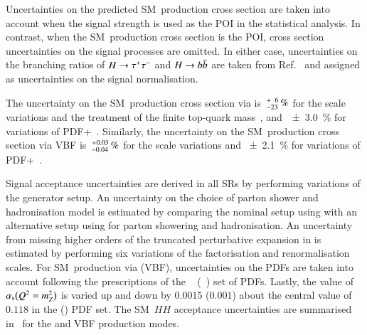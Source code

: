 Uncertainties on the predicted SM~\HH production cross section are taken into
account when the signal strength is used as the POI in the statistical
analysis. In contrast, when the SM~\HH production cross section is the POI,
cross section uncertainties on the signal processes are omitted. In either case,
uncertainties on the branching ratios of $H \to \tau^{+} \tau^{-}$ and $H \to b\bar{b}$ are
taken from Ref.~\cite{deFlorian:2016spz} and assigned as uncertainties on the
signal normalisation.

The uncertainty on the SM~\HH production cross section via \ggF
is~$^{\hspace{0.25pt}+\hspace{0.25pt}\phantom{2}6}_{-23}\,\si{\percent}$
for the scale variations and the treatment of the finite top-quark
mass~\cite{Baglio:2020wgt}, and~\SI{\pm 3.0}{\percent} for variations of
PDF+\alphas~\cite{LHCHWGHH}. Similarly, the uncertainty on the SM~\HH production
cross section via VBF
is~$^{\hspace{0.25pt}+\hspace{0.25pt}0.03}_{-0.04}\,\si{\percent}$ for
the scale variations and \SI{\pm 2.1}{\percent} for variations of
PDF+\alphas~\cite{LHCHWGHH}.

Signal acceptance uncertainties are derived in all SRs by performing variations
of the generator setup. An uncertainty on the choice of parton shower and
hadronisation model is estimated by comparing the nominal setup using \PYTHIA[8]
with an alternative setup using \HERWIG[7] for parton showering and
hadronisation. An uncertainty from missing higher orders of the truncated
perturbative expansion in \alphas is estimated by performing six variations of
the factorisation and renormalisation scales. For SM~\HH production via \ggF
(VBF), uncertainties on the PDFs are taken into account following the
prescriptions of the \PDFforLHC[15nlo]~\cite{Butterworth:2015oua}
(\NNPDF[3.0nlo]~\cite{Ball:2014uwa}) set of PDFs. Lastly, the value
of~$\alpha_{\text{s}}\mathopen{}\bigl( Q^2 = m_{Z}^2 \bigr)\mathclose{}$ is varied up and
down by $0.0015$ ($0.001$) about the central value of $0.118$ in the
\PDFforLHC[15nlo] (\NNPDF[3.0nlo]) PDF set. The SM~$HH$ acceptance uncertainties
are summarised in~ for the \ggF and VBF
production modes.


